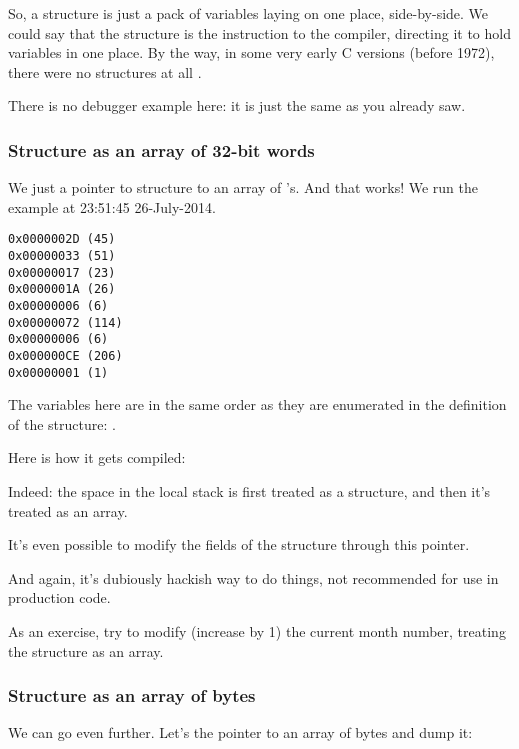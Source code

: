 So, a structure is just a pack of variables laying on one place, side-by-side.
We could say that the structure is the instruction to the compiler, directing it to hold variables in one place.
By the way, in some very early C versions (before 1972), there were no structures at all \RitchieDevC.

There is no debugger example here: it is just the same as you already saw.

\subsubsection{Structure as an array of 32-bit words}



We just  a pointer to structure to an array of \Tint{}'s.
And that works!
We run the example at 23:51:45 26-July-2014.

\begin{lstlisting}[label=GCC_tm3_output]
0x0000002D (45)
0x00000033 (51)
0x00000017 (23)
0x0000001A (26)
0x00000006 (6)
0x00000072 (114)
0x00000006 (6)
0x000000CE (206)
0x00000001 (1)
\end{lstlisting}

The variables here 
are in the same order as they are enumerated in the definition of the structure: .

Here is how it gets compiled:



Indeed: the space in the local stack is first treated as a structure, and then it's treated as an array.

It's even possible to modify the fields of the structure through this pointer.

And again, it's dubiously hackish way to do things, not recommended for use in production code.

\mysubparagraph{\Exercise}

As an exercise, try to modify (increase by 1) the current month number, treating the structure as 
an array.

\subsubsection{Structure as an array of bytes}

We can go even further. Let's  the pointer to an array of bytes and dump it:

